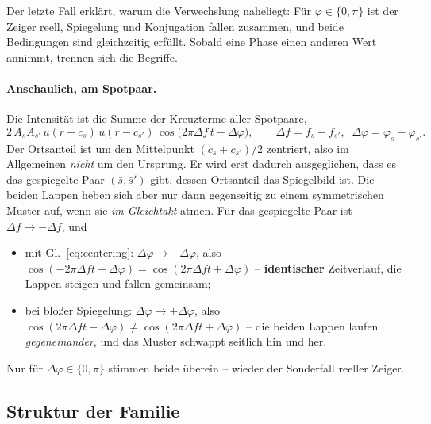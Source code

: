 \documentclass[11pt,a4paper]{article}
\begin{document}
Der letzte Fall erklärt, warum die Verwechslung naheliegt: Für
$\varphi\in\{0,\pi\}$ ist der Zeiger reell, Spiegelung und Konjugation fallen
zusammen, und beide Bedingungen sind gleichzeitig erfüllt. Sobald eine Phase
einen anderen Wert annimmt, trennen sich die Begriffe.

\paragraph{Anschaulich, am Spotpaar.}
Die Intensität ist die Summe der Kreuzterme aller Spotpaare,
\begin{equation}
  2\,A_s A_{s'}\, u(r-c_s)\,u(r-c_{s'})\,
  \cos\!\bigl(2\pi \Delta f\, t + \Delta\varphi\bigr),
  \qquad
  \Delta f = f_s - f_{s'},\;\; \Delta\varphi = \varphi_s-\varphi_{s'} .
\end{equation}
Der Ortsanteil ist um den Mittelpunkt $(c_s+c_{s'})/2$ zentriert, also im
Allgemeinen \emph{nicht} um den Ursprung. Er wird erst dadurch ausgeglichen,
dass es das gespiegelte Paar $(\bar s,\bar s')$ gibt, dessen Ortsanteil das
Spiegelbild ist. Die beiden Lappen heben sich aber nur dann gegenseitig zu
einem symmetrischen Muster auf, wenn sie \emph{im Gleichtakt} atmen. Für das
gespiegelte Paar ist $\Delta f \rightarrow -\Delta f$, und
\begin{itemize}\itemsep0.2em
  \item mit Gl.~\eqref{eq:centering}: $\Delta\varphi\rightarrow-\Delta\varphi$,
        also $\cos(-2\pi\Delta f t-\Delta\varphi)=\cos(2\pi\Delta f t+\Delta\varphi)$
        -- \textbf{identischer} Zeitverlauf, die Lappen steigen und fallen
        gemeinsam;
  \item bei bloßer Spiegelung: $\Delta\varphi\rightarrow+\Delta\varphi$, also
        $\cos(2\pi\Delta f t-\Delta\varphi)\neq\cos(2\pi\Delta f t+\Delta\varphi)$
        -- die beiden Lappen laufen \emph{gegeneinander}, und das Muster
        schwappt seitlich hin und her.
\end{itemize}
Nur für $\Delta\varphi\in\{0,\pi\}$ stimmen beide überein -- wieder der
Sonderfall reeller Zeiger.

\subsection{Struktur der Familie}
\end{document}
